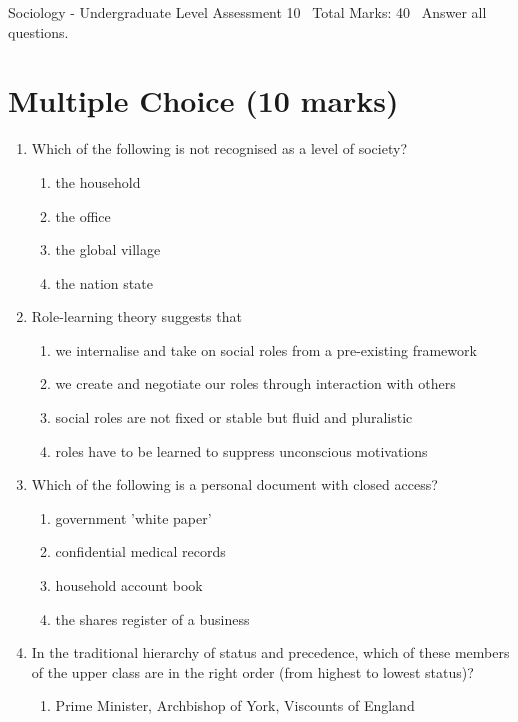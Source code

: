 \documentclass[12pt]{article}
\begin{document}
\begin{center}
Sociology - Undergraduate Level Assessment 10 \
Total Marks: 40 \
Answer all questions.
\end{center}

\section*{Multiple Choice (10 marks)}
\begin{enumerate}[label=\arabic*.]
\item Which of the following is not recognised as a level of society?
\begin{enumerate}[label=(\alph*)]
    \item the household
    \item the office
    \item the global village
    \item the nation state
\end{enumerate}
\item Role-learning theory suggests that
\begin{enumerate}[label=(\alph*)]
    \item we internalise and take on social roles from a pre-existing framework
    \item we create and negotiate our roles through interaction with others
    \item social roles are not fixed or stable but fluid and pluralistic
    \item roles have to be learned to suppress unconscious motivations
\end{enumerate}
\item Which of the following is a personal document with closed access?
\begin{enumerate}[label=(\alph*)]
    \item government 'white paper'
    \item confidential medical records
    \item household account book
    \item the shares register of a business
\end{enumerate}
\item In the traditional hierarchy of status and precedence, which of these members of the upper class are in the right order (from highest to lowest status)?
\begin{enumerate}[label=(\alph*)]
    \item Prime Minister, Archbishop of York, Viscounts of England

\end{enumerate}
\end{enumerate}
\end{document}
